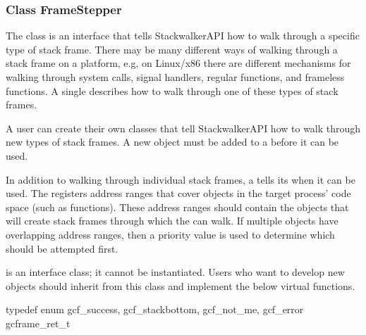 \subsubsection{Class FrameStepper}
	
The  class is an interface that tells StackwalkerAPI how to walk
through a specific type of stack frame. There may be many different ways of
walking through a stack frame on a platform, e.g, on Linux/x86 there are
different mechanisms for walking through system calls, signal handlers, regular
functions, and frameless functions. A single  describes how to walk
through one of these types of stack frames.

A user can create their own  classes that tell StackwalkerAPI how to
walk through new types of stack frames. A new  object must be added
to a  before it can be used. 

In addition to walking through individual stack frames, a  tells its
 when it can be used. The  registers address ranges that
cover objects in the target process' code space (such as functions). These
address ranges should contain the objects that will create stack frames through
which the  can walk. If multiple  objects have
overlapping address ranges, then a priority value is used to determine which
 should be attempted first.

 is an interface class; it cannot be instantiated. Users who want to
develop new  objects should inherit from this class and implement
the below virtual functions.

\begin{apient}
typedef enum { 
    gcf_success,
    gcf_stackbottom,
    gcf_not_me, 
    gcf_error 
} gcframe_ret_t
\end{apient}

